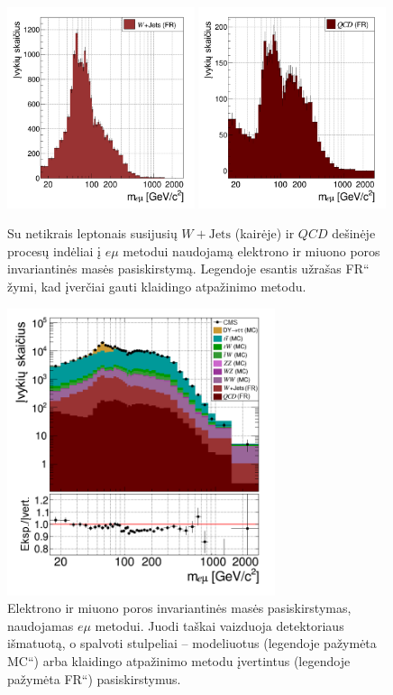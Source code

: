 \documentclass[a4paper, 12pt, oneside]{article}
\newcommand{\emu}{e\mu}
\newcommand{\WJets}{W\! +\!\mathrm{Jets}}
\newcommand{\ltq}[1]{{\quotedblbase{}#1\textquotedblleft{}}}
\newcommand{\QCD}{QC\! D}
\newlength\q
\begin{document}
\begin{figure}[H]
	\includegraphics[width=0.49\textwidth]{Magistrinis/WJETemu_est.png}
	\includegraphics[width=0.49\textwidth]{Magistrinis/QCDemu_est.png}
	\caption{\label{fig:emuBkg} Su netikrais leptonais susijusių $\WJets$ (kairėje) ir $\QCD$ dešinėje procesų
	indėliai į $\emu$ metodui naudojamą elektrono ir miuono poros invariantinės masės pasiskirstymą.
	Legendoje esantis užrašas \ltq{FR} žymi, kad įverčiai gauti klaidingo atpažinimo metodu.}
\end{figure}

\begin{figure}[H]
	\includegraphics[width=0.7\textwidth]{Magistrinis/emu_wFR.png}
	\caption{\label{fig:emuwFR} Elektrono ir miuono poros invariantinės masės pasiskirstymas, naudojamas $\emu$ metodui.
	Juodi taškai vaizduoja detektoriaus išmatuotą, o spalvoti stulpeliai -- modeliuotus (legendoje pažymėta \ltq{MC}) arba
	klaidingo atpažinimo metodu įvertintus (legendoje pažymėta \ltq{FR}) pasiskirstymus.}
\end{figure}
\end{document}
